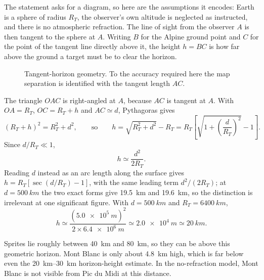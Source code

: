 \documentclass[11pt,a4paper]{article}
\newcommand{\RT}{R_T}
\begin{document}
The statement asks for a diagram, so here are the assumptions it encodes:
Earth is a sphere of radius $\RT$, the observer's own altitude is neglected as
instructed, and there is no atmospheric refraction. The line of sight from the
observer $A$ is then tangent to the sphere at $A$. Writing $B$ for the Alpine
ground point and $C$ for the point of the tangent line directly above it, the
height $h=BC$ is how far above the ground a target must be to clear the horizon.

\begin{figure}[H]
\centering
{}
\caption{Tangent-horizon geometry. To the accuracy required here the map
separation is identified with the tangent length $AC$.}
\end{figure}

The triangle $OAC$ is right-angled at $A$, because $AC$ is tangent at $A$. With
$OA=\RT$, $OC=\RT+h$ and $AC\simeq d$, Pythagoras gives
\[
 (\RT+h)^2=\RT^2+d^2,
 \qquad\text{so}\qquad
 h=\sqrt{\RT^2+d^2}-\RT=\RT\left[\sqrt{1+\left(\frac{d}{\RT}\right)^2}-1\right].
\]
Since $d/\RT\ll1$,
\[
 h\simeq \frac{d^2}{2\RT}.
\]
Reading $d$ instead as an arc length along the surface gives
$h=\RT[\sec(d/\RT)-1]$, with the same leading term $d^2/(2\RT)$; at
$d=\SI{500}{km}$ the two exact forms give \SI{19.5}{km} and \SI{19.6}{km}, so
the distinction is irrelevant at one significant figure.
With $d=\SI{500}{km}$ and $\RT=\SI{6400}{km}$,
\[
 h\simeq \frac{(\SI{5.0e5}{m})^2}{2\times \SI{6.4e6}{m}}
      \simeq \SI{2.0e4}{m}
      \simeq \SI{20}{km}.
\]

Sprites lie roughly between \SI{40}{km} and \SI{80}{km}, so they can be above this geometric horizon. Mont Blanc is only about \SI{4.8}{km} high, which is far below even the \SIrange{20}{30}{km} horizon-height estimate. In the no-refraction model, Mont Blanc is not visible from Pic du Midi at this distance.
\end{document}
